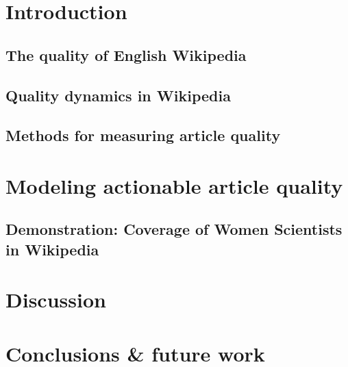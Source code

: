 \section{Introduction}
\label{sec:introduction}


\subsection{The quality of English Wikipedia}
\label{sec:quality_of_wikipedia}


\subsection{Quality dynamics in Wikipedia}
\label{sec:quality_dynamics}


\subsection{Methods for measuring article quality}
\label{sec:methods_for_measuring}


\section{Modeling actionable article quality}
\label{sec:modeling_actionable_quality}


\subsection{Demonstration: Coverage of Women Scientists in Wikipedia}
\label{sec:demonstration}


\section{Discussion}
\label{sec:discussion}


\section{Conclusions \& future work}
\label{sec:conclusion}


